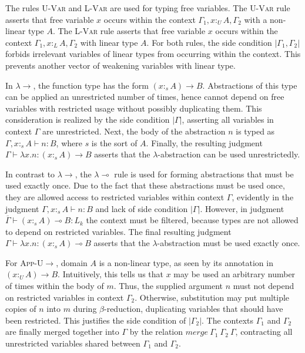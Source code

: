 \documentclass[sigplan,screen,review,anonymous]{acmart}
\newcommand{\rname}[1]{\textsc{\footnotesize #1}}
\newcommand{\pure}[1]{|#1|}
\newcommand{\utype}{:_{\scriptscriptstyle U}}
\newcommand{\ltype}{:_{\scriptscriptstyle L}}
\newcommand{\stype}[1]{:_#1}
\newcommand{\mrg}[3]{merge\ {#1}\ {#2}\ {#3}}
\begin{document}
The rules \rname{U-Var} and \rname{L-Var} are used for typing free variables. The \rname{U-Var} rule asserts that free variable $x$ occurs within the context $\Gamma_1, x \utype A, \Gamma_2$ with a non-linear type $A$. The \rname{L-Var} rule asserts that free variable $x$ occurs within the context $\Gamma_1, x \ltype A, \Gamma_2$ with linear type $A$. For both rules, the side condition $\pure{\Gamma_1, \Gamma_2}$ forbids irrelevant variables of linear types from occurring within the context. This prevents another vector of weakening variables with linear type.

In \rname{$\lambda$$\rightarrow$}, the function type has the form $(x \stype{s} A) \rightarrow B$. Abstractions of this type can be applied an unrestricted number of times, hence cannot depend on free variables with restricted usage without possibly duplicating them. This consideration is realized by the side condition $\pure{\Gamma}$, asserting all variables in context $\Gamma$ are unrestricted. Next, the body of the abstraction $n$ is typed as $\Gamma, x \stype{s} A \vdash n : B$, where $s$ is the sort of $A$. Finally, the resulting judgment $\Gamma \vdash \lambda x.n : (x \stype{s} A) \rightarrow B$ asserts that the $\lambda$-abstraction can be used unrestrictedly.

In contrast to \rname{$\lambda$$\rightarrow$}, the \rname{$\lambda$$\multimap$} rule is used for forming abstractions that must be used exactly once. Due to the fact that these abstractions must be used once, they are allowed access to restricted variables within context $\Gamma$, evidently in the judgment $\Gamma, x \stype{s} A \vdash n : B$ and lack of side condition $\pure{\Gamma}$. However, in judgment $\overline{\Gamma} \vdash (x \stype{s} A) \multimap B : L_k$ the context must be filtered, because types are not allowed to depend on restricted variables. The final resulting judgment $\Gamma \vdash \lambda x.n : (x \stype{s} A) \multimap B$ asserts that the $\lambda$-abstraction must be used exactly once.

For \rname{App-U$\rightarrow$}, domain $A$ is a non-linear type, as seen by its annotation in $(x \utype A) \rightarrow B$. Intuitively, this tells us that $x$ may be used an arbitrary number of times within the body of $m$. Thus, the supplied argument $n$ must not depend on restricted variables in context $\Gamma_2$. Otherwise, substitution may put multiple copies of $n$ into $m$ during $\beta$-reduction, duplicating variables that should have been restricted. This justifies the side condition of $\pure{\Gamma_2}$. The contexts $\Gamma_1$ and $\Gamma_2$ are finally merged together into $\Gamma$ by the relation $\mrg{\Gamma_1}{\Gamma_2}{\Gamma}$, contracting all unrestricted variables shared between $\Gamma_1$ and $\Gamma_2$.
\end{document}

